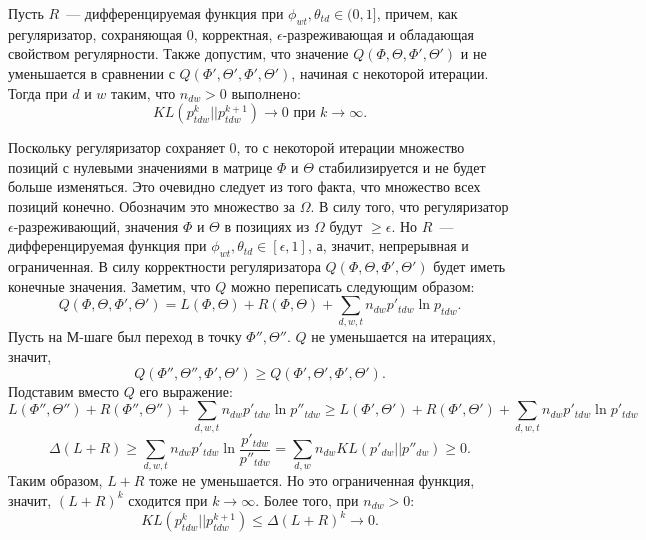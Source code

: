 \documentclass[12pt, twoside]{article}
\begin{document}
\begin{Theorem} \label{Theorem_neighbour_zero1} Пусть $R$~--- дифференцируемая функция при $\phi_{wt}, \theta_{td} \in (0, 1]$, причем, как регуляризатор, сохраняющая 0, корректная, $\epsilon$-разреживающая и обладающая свойством регулярности. Также допустим,  что значение $Q(\Phi, \Theta, \Phi', \Theta')$  и не уменьшается в сравнении с $Q(\Phi', \Theta', \Phi', \Theta')$, начиная с некоторой итерации. Тогда при $d$ и $w$ таким, что $n_{dw} > 0$ выполнено:
\[
KL(p_{tdw}^{k}||p_{tdw}^{k+1}) \to 0 \text{ при }  k \to \infty.
\]
\end{Theorem}
\begin{Proof}
Поскольку регуляризатор сохраняет 0, то с некоторой итерации множество позиций с нулевыми значениями в матрице $\Phi$ и $\Theta$ стабилизируется и не будет больше изменяться. Это очевидно следует из того факта, что  множество всех позиций конечно. Обозначим это множество за $\Omega$. В силу того, что регуляризатор $\epsilon$-разреживающий, значения $\Phi$ и $\Theta$ в позициях из $\Omega$ будут $\geq \epsilon$. Но $R$~--- дифференцируемая функция при $\phi_{wt}, \theta_{td} \in [\epsilon, 1]$, а, значит, непрерывная и ограниченная. В силу корректности регуляризатора $Q(\Phi, \Theta, \Phi', \Theta')$  будет иметь конечные значения.
Заметим, что $Q$ можно переписать следующим образом:
\[
Q(\Phi, \Theta, \Phi', \Theta') = L(\Phi, \Theta) +  R(\Phi, \Theta) + \sum\limits_{d, w, t} n_{dw} p'_{tdw} \ln{p_{tdw}}.
\]
Пусть на М-шаге был переход в точку $\Phi'', \Theta''$. $Q$ не уменьшается на итерациях, значит,
\[
	Q(\Phi'', \Theta'', \Phi', \Theta') \geq Q(\Phi', \Theta', \Phi', \Theta').
\]
Подставим вместо $Q$ его выражение:
\[
	L(\Phi'', \Theta'') + R(\Phi'', \Theta'') + \sum\limits_{d, w, t} n_{dw} p'_{tdw} \ln{p''_{tdw}}  \geq L(\Phi', \Theta') +  R(\Phi', \Theta') + \sum\limits_{d, w, t} n_{dw} p'_{tdw} \ln{p'_{tdw}}
\]
\[
	\Delta(L +  R) \geq  \sum\limits_{d, w, t} n_{dw} p'_{tdw} \ln{\frac{p'_{tdw}}{p''_{tdw}}} = \sum\limits_{d, w} n_{dw} KL(p'_{dw} || p''_{dw}) \geq 0.
\]
Таким образом, $L +  R$  тоже не уменьшается. Но это ограниченная функция, значит, $(L + R)^{k}$ сходится при $k \to \infty$. Более того, при $n_{dw} > 0$:
\[
	KL(p_{tdw}^{k}||p_{tdw}^{k+1}) \leq \Delta (L +  R)^{k} \to 0.
\]
\end{Proof}
\end{document}

